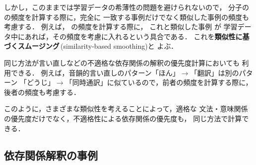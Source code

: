 しかし，このままでは学習データの希薄性の問題を避けられないので，
分子の \Formula{$\pi$}{\alpha,\beta} の頻度を計算する際に，完全に
一致する事例だけでなく類似した事例の頻度も考慮する．
例えば， の頻度を計算する際に，
これと類似した事例  が
学習データ中にあれば，その頻度を考慮に入れるという具合である．
これを{\bf 類似性に基づくスムージング}\,(similarity-based smoothing)と
よぶ．

同じ方法が言い直しなどの不適格な依存関係の解釈の優先度計算においても
利用できる．
例えば，音韻的言い直しのパターン「ほん」$\to$「翻訳」は別のパターン
「どうじ」$\to$「同時通訳」に似ているので，前者の頻度を計算する際に，
後者の頻度も考慮する．

このように，さまざまな類似性を考えることによって，適格な
文法・意味関係の優先度だけでなく，不適格性による依存関係の優先度も，
同じ方法で計算できる．

\subsection{依存関係解釈の事例}\label{sec:Corpus-based:Instance}


